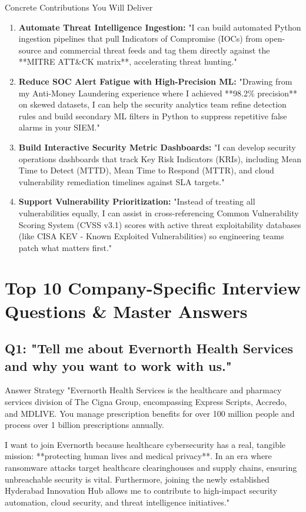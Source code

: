 \documentclass[11pt,a4paper]{article}
\begin{document}
\begin{ansbox}{Concrete Contributions You Will Deliver}
\begin{enumerate}
    \item \textbf{Automate Threat Intelligence Ingestion:}
    "I can build automated Python ingestion pipelines that pull Indicators of Compromise (IOCs) from open-source and commercial threat feeds and tag them directly against the **MITRE ATT\&CK matrix**, accelerating threat hunting."
    \item \textbf{Reduce SOC Alert Fatigue with High-Precision ML:}
    "Drawing from my Anti-Money Laundering experience where I achieved **98.2\% precision** on skewed datasets, I can help the security analytics team refine detection rules and build secondary ML filters in Python to suppress repetitive false alarms in your SIEM."
    \item \textbf{Build Interactive Security Metric Dashboards:}
    "I can develop security operations dashboards that track Key Risk Indicators (KRIs), including Mean Time to Detect (MTTD), Mean Time to Respond (MTTR), and cloud vulnerability remediation timelines against SLA targets."
    \item \textbf{Support Vulnerability Prioritization:}
    "Instead of treating all vulnerabilities equally, I can assist in cross-referencing Common Vulnerability Scoring System (CVSS v3.1) scores with active threat exploitability databases (like CISA KEV - Known Exploited Vulnerabilities) so engineering teams patch what matters first."
\end{enumerate}
\end{ansbox}

\section{Top 10 Company-Specific Interview Questions \& Master Answers}

\subsection*{Q1: "Tell me about Evernorth Health Services and why you want to work with us."}
\begin{ansbox}{Answer Strategy}
"Evernorth Health Services is the healthcare and pharmacy services division of The Cigna Group, encompassing Express Scripts, Accredo, and MDLIVE. You manage prescription benefits for over 100 million people and process over 1 billion prescriptions annually. 

I want to join Evernorth because healthcare cybersecurity has a real, tangible mission: **protecting human lives and medical privacy**. In an era where ransomware attacks target healthcare clearinghouses and supply chains, ensuring unbreachable security is vital. Furthermore, joining the newly established Hyderabad Innovation Hub allows me to contribute to high-impact security automation, cloud security, and threat intelligence initiatives."
\end{ansbox}
\end{document}
